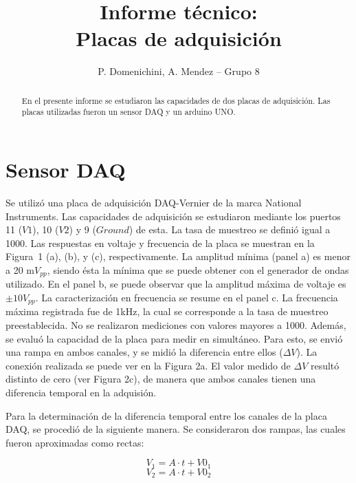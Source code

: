 \documentclass[a4paper,10pt]{article}
\title{Informe técnico: \\
Placas de adquisición}
\author{P. Domenichini, A. Mendez -- Grupo 8}
\begin{document}
\maketitle

\begin{abstract}
    En el presente informe se estudiaron las capacidades de dos placas de adquisición. Las placas utilizadas fueron un sensor DAQ y un arduino UNO. 
\end{abstract}

\section{Sensor DAQ}

Se utilizó una placa de adquisición DAQ-Vernier de la marca National Instruments. Las capacidades de adquisición se estudiaron mediante los puertos 11 ($V1$), 10 ($V2$) y 9 ($Ground$) de esta. La tasa de muestreo se definió igual a 1000. Las respuestas en voltaje y frecuencia de la placa se muestran en la Figura~1 (a), (b), y (c), respectivamente. La amplitud mínima (panel a) es menor a 20 m$V_{pp}$, siendo ésta la mínima que se puede obtener con el generador de ondas utilizado. En el panel b, se puede observar que la amplitud máxima de voltaje es $\pm 10 V_{pp}$.  La caracterización en frecuencia se resume en el panel c. La frecuencia máxima registrada fue de 1kHz, la cual se corresponde a la tasa de muestreo preestablecida. No se realizaron mediciones con valores mayores a 1000. 
Además, se evaluó la capacidad de la placa para medir en simultáneo. Para esto, se envió una rampa en ambos canales, y se midió la  diferencia entre ellos ($\Delta V$). La conexión realizada se puede ver en la Figura 2a. El valor medido de $\Delta V$ resultó distinto de cero (ver Figura 2c), de manera que ambos canales tienen una diferencia temporal en la adquisión. 

Para la determinación de la diferencia temporal entre los canales de la placa DAQ, se procedió de la siguiente manera. Se consideraron dos rampas, las cuales fueron aproximadas como rectas:

\begin{equation*}
    V_{1} = A \cdot t + V0_1
\end{equation*}
\begin{equation*}
    V_{2} = A \cdot t + V0_2
\end{equation*}
\end{document}
